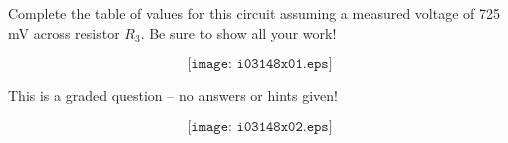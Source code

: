 

Complete the table of values for this circuit assuming a measured voltage of 725 mV across resistor $R_3$.  Be sure to show all your work!

$$\texttt{[image: i03148x01.eps]}$$


\vfil 

\eject






This is a graded question -- no answers or hints given!







$$\texttt{[image: i03148x02.eps]}$$



